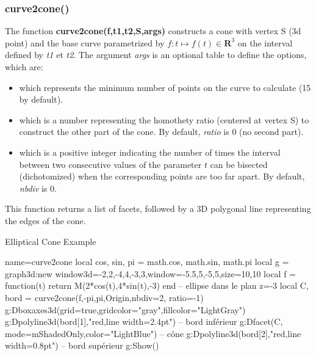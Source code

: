 \subsubsection{curve2cone()}
The function \textbf{curve2cone(f,t1,t2,S,args)} constructs a cone with vertex S (3d point) and the base curve parametrized by $f\colon t\mapsto f(t)\in\mathbf R^3$ on the interval defined by \emph{t1} et \emph{t2}. The argument \emph{args} is an optional table to define the options, which are:
\begin{itemize}
    \item {} which represents the minimum number of points on the curve to calculate (15 by default).
    \item {} which is a number representing the homothety ratio (centered at vertex S) to construct the other part of the cone. By default, \emph{ratio} is 0 (no second part).     
    \item {} which is a positive integer indicating the number of times the interval between two consecutive values ​​of the parameter $t$ can be bisected (dichotomized) when the corresponding points are too far apart. By default, \emph{nbdiv} is 0.
\end{itemize}

This function returns a list of facets, followed by a 3D polygonal line representing the edges of the cone.

\begin{demo}{Elliptical Cone Example}
\begin{luadraw}{name=curve2cone}
local cos, sin, pi = math.cos, math.sin, math.pi
local g = graph3d:new{ window3d={-2,2,-4,4,-3,3},window={-5.5,5,-5,5},size={10,10}}
local f = function(t) return M(2*cos(t),4*sin(t),-3) end -- ellipse dans le plan z=-3
local C, bord = curve2cone(f,-pi,pi,Origin,{nbdiv=2, ratio=-1})
g:Dboxaxes3d({grid=true,gridcolor="gray",fillcolor="LightGray"})
g:Dpolyline3d(bord[1],"red,line width=2.4pt") -- bord inférieur
g:Dfacet(C, {mode=mShadedOnly,color="LightBlue"})  -- cône
g:Dpolyline3d(bord[2],"red,line width=0.8pt") -- bord supérieur
g:Show()
\end{luadraw}
\end{demo}

